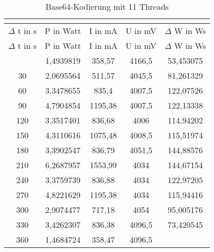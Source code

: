 
\begin{longtable}[c]{ccccc}
\caption{Base64-Kodierung mit 11 Threads} \\
\label{tab:Base64MessungThreadElf}\\
\hline
{$\Delta$ t in s} & {P in Watt} & {I in mA} & {U in mV} & {$\Delta$ W in Ws} \\
\hline
\endfirsthead
\hline
$\Delta$ t in s & P in Watt & I in mA & U in mV & $\Delta$ W in Ws \\
\hline
\endhead
\hline
\endfoot
\hline
     \midrule
    0     & 1,4939819 & 358,57 & 4166,5 & 53,453075 \\
    \midrule
    30    & 2,0695564 & 511,57 & 4045,5 & 81,261329 \\
    \midrule
    60    & 3,3478655 & 835,4 & 4007,5 & 122,07526 \\
    \midrule
    90    & 4,7904854 & 1195,38 & 4007,5 & 122,13338 \\
    \midrule
    120   & 3,3517401 & 836,68 & 4006  & 114,94202 \\
    \midrule
    150   & 4,3110616 & 1075,48 & 4008,5 & 115,51974 \\
    \midrule
    180   & 3,3902547 & 836,79 & 4051,5 & 144,88576 \\
    \midrule
    210   & 6,2687957 & 1553,99 & 4034  & 144,67154 \\
    \midrule
    240   & 3,3759739 & 836,88 & 4034  & 122,97205 \\
    \midrule
    270   & 4,8221629 & 1195,38 & 4034  & 115,94416 \\
    \midrule
    300   & 2,9074477 & 717,18 & 4054  & 95,005176 \\
    \midrule
    330   & 3,4262307 & 836,38 & 4096,5 & 73,420545 \\
    \midrule
    360   & 1,4684724 & 358,47 & 4096,5 &  \\
\end{longtable}